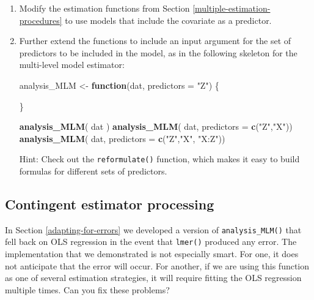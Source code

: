 \documentclass[
]{book}
\newenvironment{Shaded}{\begin{snugshade}}{\end{snugshade}}
\newcommand{\AttributeTok}[1]{\textcolor[rgb]{0.13,0.29,0.53}{#1}}
\newcommand{\ControlFlowTok}[1]{\textcolor[rgb]{0.13,0.29,0.53}{\textbf{#1}}}
\newcommand{\FunctionTok}[1]{\textcolor[rgb]{0.13,0.29,0.53}{\textbf{#1}}}
\newcommand{\NormalTok}[1]{#1}
\newcommand{\OtherTok}[1]{\textcolor[rgb]{0.56,0.35,0.01}{#1}}
\newcommand{\StringTok}[1]{\textcolor[rgb]{0.31,0.60,0.02}{#1}}
\begin{document}
\begin{enumerate}
\def\labelenumi{\arabic{enumi}.}
\item
  Modify the estimation functions from Section \ref{multiple-estimation-procedures} to use models that include the covariate as a predictor.
\item
  Further extend the functions to include an input argument for the set of predictors to be included in the model, as in the following skeleton for the multi-level model estimator:

\begin{Shaded}
\begin{Highlighting}[]
\NormalTok{analysis\_MLM }\OtherTok{\textless{}{-}} \ControlFlowTok{function}\NormalTok{(dat, }\AttributeTok{predictors =} \StringTok{"Z"}\NormalTok{) \{}

\NormalTok{\}}

\FunctionTok{analysis\_MLM}\NormalTok{( dat )}
\FunctionTok{analysis\_MLM}\NormalTok{( dat, }\AttributeTok{predictors =} \FunctionTok{c}\NormalTok{(}\StringTok{"Z"}\NormalTok{,}\StringTok{"X"}\NormalTok{))}
\FunctionTok{analysis\_MLM}\NormalTok{( dat, }\AttributeTok{predictors =} \FunctionTok{c}\NormalTok{(}\StringTok{"Z"}\NormalTok{,}\StringTok{"X"}\NormalTok{, }\StringTok{"X:Z"}\NormalTok{))}
\end{Highlighting}
\end{Shaded}

  Hint: Check out the \texttt{reformulate()} function, which makes it easy to build formulas for different sets of predictors.
\end{enumerate}

\subsection{Contingent estimator processing}\label{contingent-estimator-processing}

In Section \ref{adapting-for-errors} we developed a version of \texttt{analysis\_MLM()} that fell back on OLS regression in the event that \texttt{lmer()} produced any error.
The implementation that we demonstrated is not especially smart.
For one, it does not anticipate that the error will occur.
For another, if we are using this function as one of several estimation strategies, it will require fitting the OLS regression multiple times.
Can you fix these problems?
\end{document}
